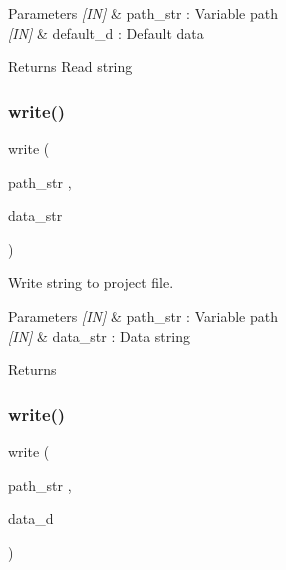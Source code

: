 \begin{DoxyParams}{Parameters}
{\em \mbox{[}\+I\+N\mbox{]}} & path\+\_\+str \+: Variable path \\
\hline
{\em \mbox{[}\+I\+N\mbox{]}} & default\+\_\+d \+: Default data \\
\hline
\end{DoxyParams}
\begin{DoxyReturn}{Returns}
Read string 
\end{DoxyReturn}
\mbox{\label{classproject_aaf117f090d9f4647b6f61bba28aa109c}} 
\subsubsection{write()\hspace{0.1cm}{\footnotesize\ttfamily [1/2]}}
{\footnotesize\ttfamily write (\begin{DoxyParamCaption}\item[{path\+\_\+str}]{,  }\item[{data\+\_\+str}]{ }\end{DoxyParamCaption})}



Write string to project file. 


\begin{DoxyCode}{0}
\end{DoxyCode}



\begin{DoxyParams}{Parameters}
{\em \mbox{[}\+I\+N\mbox{]}} & path\+\_\+str \+: Variable path \\
\hline
{\em \mbox{[}\+I\+N\mbox{]}} & data\+\_\+str \+: Data string \\
\hline
\end{DoxyParams}
\begin{DoxyReturn}{Returns}

\end{DoxyReturn}
\mbox{\label{classproject_afdccef80eefb51ebec4659ab24b1b82f}} 
\subsubsection{write()\hspace{0.1cm}{\footnotesize\ttfamily [2/2]}}
{\footnotesize\ttfamily write (\begin{DoxyParamCaption}\item[{path\+\_\+str}]{,  }\item[{data\+\_\+d}]{ }\end{DoxyParamCaption})}



